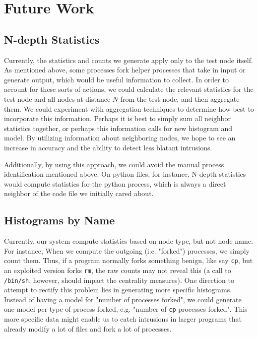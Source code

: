 \documentclass[10pt,twocolumn]{article}
\begin{document}
%

\section{Future Work}
\subsection{N-depth Statistics}
Currently, the statistics and counts we generate apply only to the test node itself. As mentioned above, some processes fork helper processes that take in input or generate output, which would be useful information to collect. In order to account for these sorts of actions, we could calculate the relevant statistics for the test node and all nodes at distance $N$ from the test node, and then aggregate them. We could experiment with aggregation techniques to determine how best to incorporate this information. Perhaps it is best to simply sum all neighbor statistics together, or perhaps this information calls for new histogram and model. By utilizing information about neighboring nodes, we hope to see an increase in accuracy and the ability to detect less blatant intrusions.

Additionally, by using this approach, we could avoid the manual process identification mentioned above. On python files, for instance, N-depth statistics would compute statistics for the python process, which is always a direct neighbor of the code file we initially cared about.

\subsection{Histograms by Name}
Currently, our system compute statistics based on node type, but not node name. For instance, When we compute the outgoing (i.e. "forked") processes, we simply count them. Thus, if a program normally forks something benign, like say \texttt{cp}, but an exploited version forks \texttt{rm}, the raw counts may not reveal this (a call to \texttt{/bin/sh}, however, should impact the centrality measures). One direction to attempt to rectify this problem lies in generating more specific histograms. Instead of having a model for "number of processes forked", we could generate one model per type of process forked, e.g. "number of \texttt{cp} processes forked". This more specific data might enable us to catch intrusions in larger programs that already modify a lot of files and fork a lot of processes.
\end{document}
